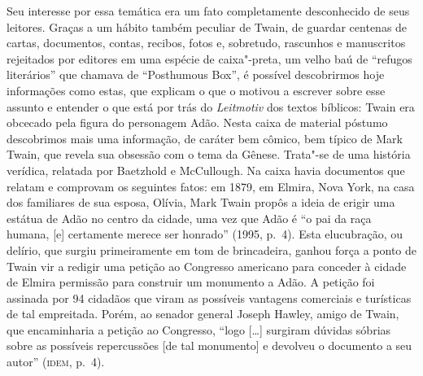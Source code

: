 Seu interesse por essa temática era um fato completamente desconhecido de
seus leitores. Graças a um hábito também peculiar de Twain, de guardar
centenas de cartas, documentos, contas, recibos, fotos e, sobretudo,
rascunhos e manuscritos rejeitados por editores em uma espécie de 
caixa"-preta, um velho baú de ``refugos literários''
que chamava de ``Posthumous Box'', é
possível descobrirmos hoje informações como estas, que explicam o que o
motivou a escrever sobre esse assunto e entender o que está por trás do 
\textit{Leitmotiv} dos textos bíblicos: Twain era obcecado pela figura do
personagem Adão. Nesta caixa de material póstumo descobrimos mais uma
informação, de caráter bem cômico, bem típico de Mark Twain, que revela
sua obsessão com o tema da Gênese. Trata"-se de uma história verídica,
relatada por Baetzhold e McCullough. Na caixa havia documentos que relatam
e comprovam os seguintes fatos: em 1879, em Elmira, Nova York, na casa
dos familiares de sua esposa, Olívia, Mark Twain propôs a ideia de erigir
uma estátua de Adão no centro da cidade, uma vez que Adão é “o pai da raça
humana, [e] certamente merece ser honrado” (1995, p.~4). Esta elucubração,
ou delírio, que surgiu primeiramente em tom de brincadeira, ganhou força
a ponto de Twain vir a redigir uma petição ao Congresso americano
para conceder à cidade de Elmira permissão para construir um monumento
a Adão. A petição foi assinada por 94 cidadãos que viram
as possíveis vantagens comerciais e turísticas de tal empreitada. Porém,
ao senador general Joseph Hawley, amigo de Twain, que encaminharia a
petição ao Congresso, ``logo [\ldots{}] surgiram dúvidas sóbrias sobre as
possíveis repercussões [de tal monumento] e devolveu o documento a seu
autor'' (\textsc{idem}, p.~4).

